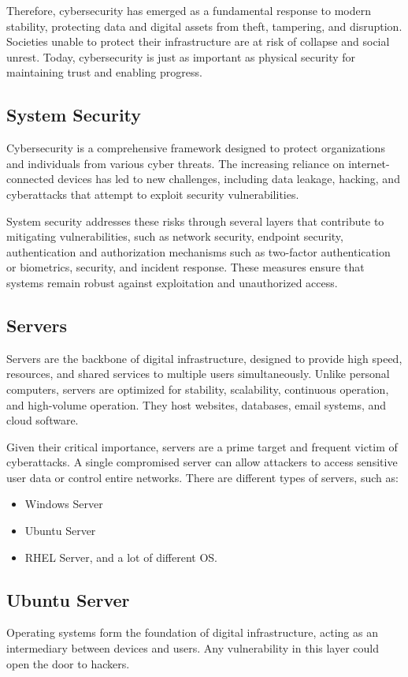 \documentclass[12pt,a4paper]{report} %
\begin{document}
Therefore, cybersecurity has emerged as a fundamental response to modern stability, protecting data and digital assets from theft, tampering, and disruption. Societies unable to protect their infrastructure are at risk of collapse and social unrest. Today, cybersecurity is just as important as physical security for maintaining trust and enabling progress.

\subsection{System Security}
Cybersecurity is a comprehensive framework designed to protect organizations and individuals from various cyber threats. The increasing reliance on internet-connected devices has led to new challenges, including data leakage, hacking, and cyberattacks that attempt to exploit security vulnerabilities.

System security addresses these risks through several layers that contribute to mitigating vulnerabilities, such as network security, endpoint security, authentication and authorization mechanisms such as two-factor authentication or biometrics, security, and incident response. These measures ensure that systems remain robust against exploitation and unauthorized access.

\subsection{Servers}
Servers are the backbone of digital infrastructure, designed to provide high speed, resources, and shared services to multiple users simultaneously. Unlike personal computers, servers are optimized for stability, scalability, continuous operation, and high-volume operation. They host websites, databases, email systems, and cloud software.

Given their critical importance, servers are a prime target and frequent victim of cyberattacks. A single compromised server can allow attackers to access sensitive user data or control entire networks. There are different types of servers, such as:
\begin{itemize}[leftmargin=*]
   \item Windows Server
   \item Ubuntu Server
   \item RHEL Server, and a lot of different OS.
\end{itemize}

\subsection{Ubuntu Server}
Operating systems form the foundation of digital infrastructure, acting as an intermediary between devices and users. Any vulnerability in this layer could open the door to hackers.
\end{document}
